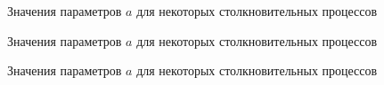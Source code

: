 \documentclass[%
master,    %
natbib,      %
subf,        %
href,        %
colorlinks,  %
]{disser}
\begin{document}
\begin{figure}
	\caption{Значения параметров $a$ для некоторых столкновительных процессов}
	\label{ris:a-1}
\end{figure}
\begin{figure}
	\caption{Значения параметров $a$ для некоторых столкновительных процессов}
	\label{ris:a-2}
\end{figure}
\begin{figure}
	\caption{Значения параметров $a$ для некоторых столкновительных процессов}
	\label{ris:a-3}
\end{figure}
\end{document}
